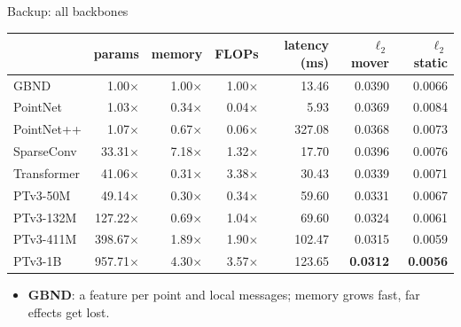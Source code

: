 \documentclass[aspectratio=169,12pt]{beamer}
\newcommand{\src}[1]{{\scriptsize\color{mute}\citep{#1}}}
\newcommand{\pw}[1]{{\color{pw}#1}}
\newenvironment{notes}[1][\linewidth]
  {\begin{minipage}{#1}\footnotesize\begin{itemize}\setlength{\itemsep}{2pt}}
  {\end{itemize}\end{minipage}}
\begin{document}
\begin{frame}[label=bk-backbones]{Backup: all backbones}
  \vfill
  {\centering\small
  \setlength{\tabcolsep}{5pt}
  \begin{tabular}{@{}lrrrrrr@{}}
    \toprule
    & params & memory & FLOPs & latency (ms) & $\ell_2$ mover & $\ell_2$ static \\
    \midrule
    GBND \src{ai2025review} & 1.00$\times$ & 1.00$\times$ & 1.00$\times$ & 13.46 & 0.0390 & 0.0066 \\
    PointNet & 1.03$\times$ & 0.34$\times$ & 0.04$\times$ & 5.93 & 0.0369 & 0.0084 \\
    PointNet++ & 1.07$\times$ & 0.67$\times$ & 0.06$\times$ & 327.08 & 0.0368 & 0.0073 \\
    SparseConv & 33.31$\times$ & 7.18$\times$ & 1.32$\times$ & 17.70 & 0.0396 & 0.0076 \\
    Transformer & 41.06$\times$ & 0.31$\times$ & 3.38$\times$ & 30.43 & 0.0339 & 0.0071 \\
    \pw{PTv3-50M} & 49.14$\times$ & 0.30$\times$ & 0.34$\times$ & 59.60 & 0.0331 & 0.0067 \\
    \pw{PTv3-132M} & 127.22$\times$ & 0.69$\times$ & 1.04$\times$ & 69.60 & 0.0324 & 0.0061 \\
    \pw{PTv3-411M} & 398.67$\times$ & 1.89$\times$ & 1.90$\times$ & 102.47 & 0.0315 & 0.0059 \\
    \pw{PTv3-1B} & 957.71$\times$ & 4.30$\times$ & 3.57$\times$ & 123.65 & \textbf{0.0312}
      & \textbf{0.0056} \\
    \bottomrule
  \end{tabular}\par
  \par}
  \vfill
  \begin{notes}[\linewidth]
    \item \textbf{GBND}: a feature per point and local messages; memory grows fast, far
      effects get lost.
  \end{notes}
  \vfill
    {}
\end{frame}
\end{document}
